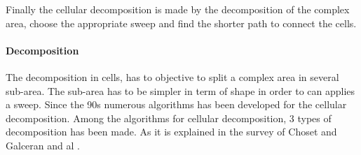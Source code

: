  Finally the cellular decomposition is made by the decomposition of the complex area, choose the appropriate sweep and find the shorter path to connect the cells. 
 
 \paragraph*{Decomposition}\label{par:decomposition}

 The decomposition in cells, has to objective to split a complex area in several sub-area. The sub-area has to be simpler in term of shape in order to can applies a sweep. 
Since the 90s numerous algorithms has been developed for the cellular decomposition. Among the algorithms for cellular decomposition, 3 types of decomposition has been made. As it is explained in the survey of Choset  \cite{214*choset2001} and  Galceran and al \cite{66*galceran2013}. 
